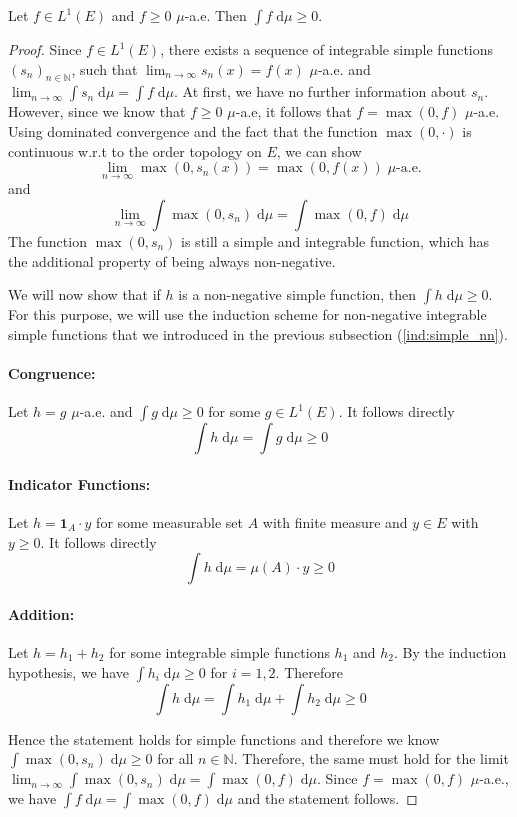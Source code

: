 \begin{lemma}\label{nonneg_integral}
	Let $f \in L^1(E)$ and $f \ge 0$ $\mu$-a.e. Then $\int f \;\textrm{d}\mu \ge 0$.
\end{lemma}
\begin{proof}
	Since $f \in L^1(E)$, there exists a sequence of integrable simple functions $(s_n)_{n \in \mathbb{N}}$, such that $\lim_{n \to \infty} s_n(x) = f(x)$ $\mu$-a.e. and $\lim_{n \to \infty} \int s_n \;\textrm{d}\mu = \int f \;\textrm{d}\mu$. At first, we have no further information about $s_n$. However, since we know that $f \ge 0$ $\mu$-a.e, it follows that $f = \max(0,f)$ $\mu$-a.e. Using dominated convergence and the fact that the function $\max(0,\cdot)$ is continuous w.r.t to the order topology on $E$, we can show
\[
	\lim_{n \to \infty} \max(0, s_n(x)) = \max(0, f(x)) \; \mu\textrm{-a.e.}
\]
and
\[
	\lim_{n \to \infty} \int \max(0, s_n) \;\textrm{d}\mu = \int \max(0, f) \;\textrm{d}\mu
\]
The function $\max(0, s_n)$ is still a simple and integrable function, which has the additional property of being always non-negative. 

We will now show that if $h$ is a non-negative simple function, then $\int h \;\textrm{d}\mu \ge 0$. For this purpose, we will use the induction scheme for non-negative integrable simple functions that we introduced in the previous subsection (\ref{ind:simple_nn}).

\paragraph{Congruence:} Let $h = g$ $\mu$-a.e. and $\int g \;\textrm{d}\mu \ge 0$ for some $g \in L^1(E)$. It follows directly
\[
	\int h \;\textrm{d}\mu = \int g \;\textrm{d}\mu \ge 0
\]

\paragraph{Indicator Functions:} Let $h = \mathbf{1}_A \cdot y$ for some measurable set $A$ with finite measure and $y \in E$ with $y \ge 0$. It follows directly 
\[
	\int h \;\textrm{d}\mu = \mu(A) \cdot y \ge 0
\]

\paragraph{Addition:} Let $h = h_1 + h_2$ for some integrable simple functions $h_1$ and $h_2$. By the induction hypothesis, we have $\int h_i \;\textrm{d}\mu \ge 0$ for $i = 1,2$. Therefore
\[
	\int h \;\textrm{d}\mu = \int h_1 \;\textrm{d}\mu + \int h_2 \;\textrm{d}\mu \ge 0
\]

Hence the statement holds for simple functions and therefore we know $\int \max(0, s_n) \;\textrm{d}\mu \ge 0$ for all $n \in \mathbb{N}$. Therefore, the same must hold for the limit $\lim_{n \to \infty} \int \max(0, s_n) \;\textrm{d}\mu = \int \max(0, f) \;\textrm{d}\mu$. Since $f = \max(0,f)$ $\mu$-a.e., we have $\int f \;\textrm{d}\mu = \int \max(0, f) \;\textrm{d}\mu$ and the statement follows.

\end{proof}
